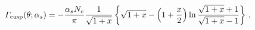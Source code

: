 \begin{equation}
{\mit\Gamma}_{\rm cusp} (\theta; \alpha_s) = - \frac{\alpha_s N_c}{\pi}
\frac{1}{\sqrt{1 + x}}
\left\{
\sqrt{1 + x}
-
\left(1 + \frac{x}{2} \right) \ln \frac{\sqrt{1 + x} + 1}{\sqrt{1 + x} - 1}
\right\}
\, ,
\label{Cusp-x}
\end{equation}

